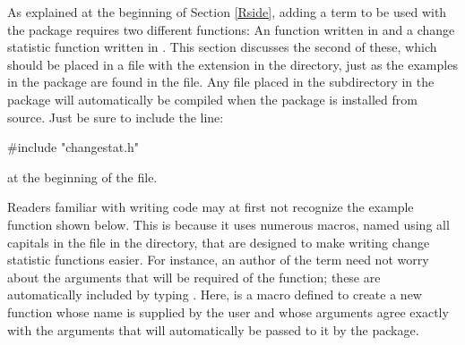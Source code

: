 \documentclass[nojss]{jss}
\begin{document}
As explained at the beginning of Section \ref{Rside}, adding a term to be
used with the  package requires two different functions:  An
 function written in  and a
change statistic function written in .  This section discusses the
second of these, which should be placed in a file with the extension 
in the  directory, just as the examples in the
 package are found in the 
file.
Any  file placed in the  subdirectory in the
 package will
automatically be compiled when the package is installed from source. Just be sure to include the line:
\begin{CodeChunk}
\begin{CodeInput}
#include "changestat.h"
\end{CodeInput}
\end{CodeChunk}
at the beginning of the file.

Readers familiar with writing  code may at first not recognize
the example  function shown below.  This is because it
uses numerous macros, named using all capitals
in the  file in the
 directory, that are designed to make writing change statistic
functions easier.
For instance, an author of the  term need not worry about
the arguments that will be required of the  function; these
are automatically included by typing
.  Here,  is a macro
defined to create a new function whose name is supplied by the user and
whose arguments agree exactly with the arguments that will automatically be passed to
it by the  package.
\end{document}
